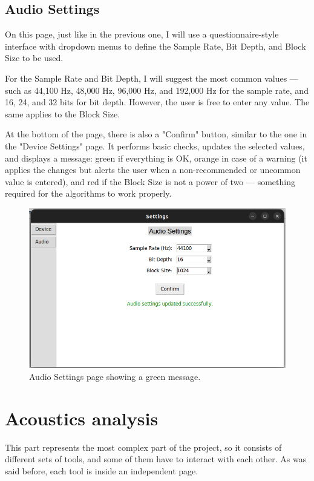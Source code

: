 \subsection{Audio Settings}

On this page, just like in the previous one, I will use a questionnaire-style interface with dropdown menus to define the Sample Rate, Bit Depth, and Block Size to be used.

For the Sample Rate and Bit Depth, I will suggest the most common values — such as 44,100 Hz, 48,000 Hz, 96,000 Hz, and 192,000 Hz for the sample rate, and 16, 24, and 32 bits for bit depth. However, the user is free to enter any value. The same applies to the Block Size.

At the bottom of the page, there is also a "Confirm" button, similar to the one in the "Device Settings" page. It performs basic checks, updates the selected values, and displays a message: green if everything is OK, orange in case of a warning (it applies the changes but alerts the user when a non-recommended or uncommon value is entered), and red if the Block Size is not a power of two — something required for the algorithms to work properly.

\begin{figure}[H]
	\centering
	\includegraphics[width=0.8
	\linewidth]{Figures/AudSet.png}
	\caption[Audio setting page]{Audio Settings page showing a green message.}
	\label{fig:Audio Settings}
\end{figure}



\section{Acoustics analysis}

This part represents the most complex part of the project, so it consists of different sets of tools, and some of them have to interact with each other. As was said before, each tool is inside an independent page.

